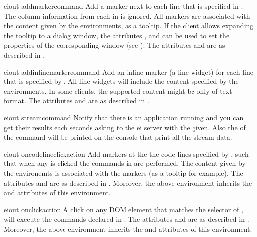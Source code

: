 \bigskip
\xmlstruct
{eiout}
{addmarkercommand}
{%
%
  Add a marker next to each line that is specified in
  . The column information from each
   in  is
  ignored.  All markers are associated with the content given by the
   environments, as a tooltip. If the
  client allows expanding the tooltip to a dialog window, the
  attributes ,  and
   can be used to set the properties of the
  corresponding window (see ).
%
  The attributes  and  are
  as described in .
%
}

\bigskip
\xmlstruct
{eiout}
{addinlinemarkercommand}
{%
%
  Add an inline marker (a line widget) for each line that is specified
  by . All line widgets will include the content
  specified by the  environments. In some
  clients, the supported content might be only of text format.
%
  The attributes  and  are
  as described in .
%
}


\bigskip
\xmlstruct
{eiout}
{streamcommand}
{%
%
  Notify that there is an application running and you can get their
  results each  seconds asking to the ei server
  with the  given.
  Also the  of the command will be
  printed on the console  that print all the
  stream data. 
%
}


\bigskip
\xmlstruct
{eiout}
{oncodelineclickaction}
{%
%
  Add markers at the the code lines specified by ,
  such that when any is clicked the commands in
   are performed.
  The content given by the  environemts is
  associated with the markers (as a tooltip for example).
%
  The attributes  and  are
  as described in . Moreover, the above
   environment inherits the
   and  attributes of this
  environment.
%
}


\bigskip
\xmlstruct
{eiout}
{onclickaction}
{%
%
  A click on any DOM element that matches the selector of
  , will execute the commands declared in
  .
%
  The attributes  and  are
  as described in . Moreover, the above
   environment inherits the
   and  attributes of this
  environment.
%
}



